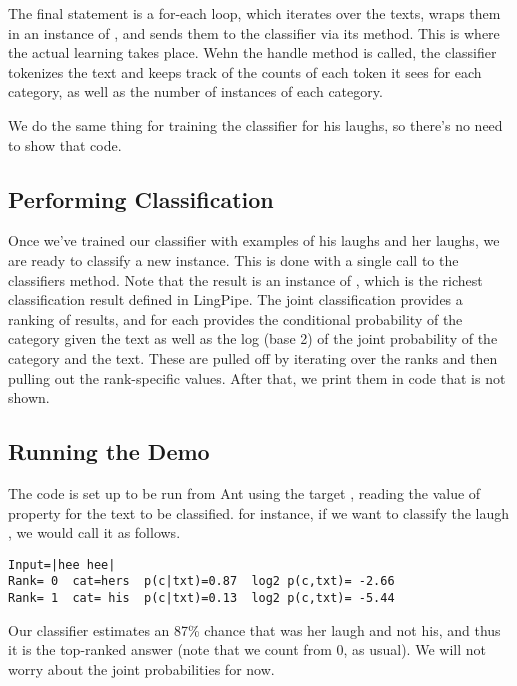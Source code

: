 The final statement is a for-each loop, which iterates over the texts,
wraps them in an instance of , and
sends them to the classifier via its
 method.  This is where the
actual learning takes place.  Wehn the handle method is called, the
classifier tokenizes the text and keeps track of the counts of each
token it sees for each category, as well as the number of instances
of each category.  

We do the same thing for training the classifier for his laughs,
so there's no need to show that code.

\subsection{Performing Classification}

Once we've trained our classifier with examples of his laughs and
her laughs, we are ready to classify a new instance.  This is
done with a single call to the classifiers 
method.
%
%
Note that the result is an instance of ,
which is the richest classification result defined in LingPipe.  The
joint classification provides a ranking of results, and for each
provides the conditional probability of the category given the text as
well as the log (base 2) of the joint probability of the category and
the text.  These are pulled off by iterating over the ranks and
then pulling out the rank-specific values.  After that, we print them
in code that is not shown.

\subsection{Running the Demo}

The code is set up to be run from Ant using the target ,
reading the value of property  for the text to be classified.
for instance, if we want to classify the laugh ,
we would call it as follows.
%
\begin{verbatim}
Input=|hee hee|
Rank= 0  cat=hers  p(c|txt)=0.87  log2 p(c,txt)= -2.66
Rank= 1  cat= his  p(c|txt)=0.13  log2 p(c,txt)= -5.44
\end{verbatim}
%
Our classifier estimates an 87\% chance that  was
her laugh and not his, and thus it is the top-ranked answer (note that
we count from 0, as usual).  We will not worry about the joint
probabilities for now.  

